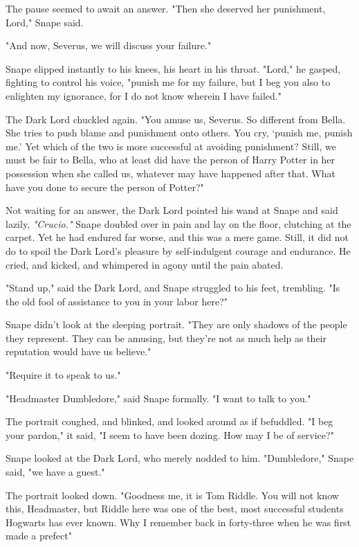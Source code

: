 The pause seemed to await an answer. "Then she deserved her punishment, Lord," Snape said.

"And now, Severus, we will discuss your failure."

Snape slipped instantly to his knees, his heart in his throat. "Lord," he gasped, fighting to control his voice, "punish me for my failure, but I beg you also to enlighten my ignorance, for I do not know wherein I have failed."

The Dark Lord chuckled again. "You amuse us, Severus. So different from Bella. She tries to push blame and punishment onto others. You cry, `punish me, punish me.' Yet which of the two is more successful at avoiding punishment? Still, we must be fair to Bella, who at least did have the person of Harry Potter in her possession when she called us, whatever may have happened after that. What have you done to secure the person of Potter?"

Not waiting for an answer, the Dark Lord pointed his wand at Snape and said lazily, \emph{"Crucio."} Snape doubled over in pain and lay on the floor, clutching at the carpet. Yet he had endured far worse, and this was a mere game. Still, it did not do to spoil the Dark Lord's pleasure by self-indulgent courage and endurance. He cried, and kicked, and whimpered in agony until the pain abated.

"Stand up," said the Dark Lord, and Snape struggled to his feet, trembling. "Is the old fool of assistance to you in your labor here?"

Snape didn't look at the sleeping portrait. "They are only shadows of the people they represent. They can be amusing, but they're not as much help as their reputation would have us believe."

"Require it to speak to us."

"Headmaster Dumbledore," said Snape formally. "I want to talk to you."

The portrait coughed, and blinked, and looked around as if befuddled. "I beg your pardon," it said, "I seem to have been dozing. How may I be of service?"

Snape looked at the Dark Lord, who merely nodded to him. "Dumbledore," Snape said, "we have a guest."

The portrait looked down. "Goodness me, it is Tom Riddle. You will not know this, Headmaster, but Riddle here was one of the best, most successful students Hogwarts has ever known. Why I remember back in forty-three when he was first made a prefect{\el}"

